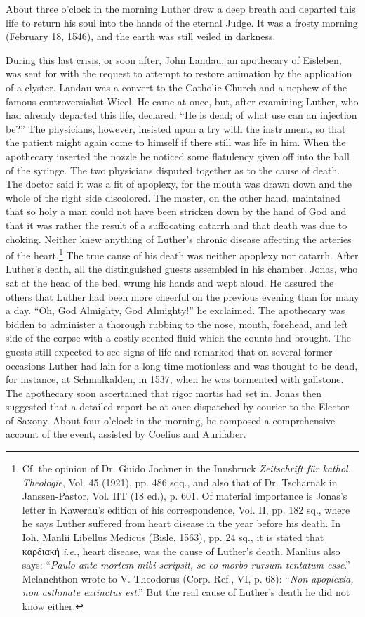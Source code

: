 About three o’clock in the morning Luther drew a deep breath and
departed this life to return his soul into the hands of the eternal
Judge. It was a frosty morning (February 18, 1546), and the earth
was still veiled in darkness.

During this last crisis, or soon after, John Landau, an apothecary
of Eisleben, was sent for with the request to attempt to restore animation
by the application of a clyster. Landau was a convert to the
Catholic Church and a nephew of the famous controversialist Wicel.
He came at once, but, after examining Luther, who had already departed
this life, declared: “He is dead; of what use can an injection
be?” The physicians, however, insisted upon a try with the instrument,
so that the patient might again come to himself if there still
was life in him. When the apothecary inserted the nozzle he noticed
some flatulency given off into the ball of the syringe. The two physicians
disputed together as to the cause of death. The doctor said
it was a fit of apoplexy, for the mouth was drawn down and the
whole of the right side discolored. The master, on the other hand,
maintained that so holy a man could not have been stricken down
by the hand of God and that it was rather the result of a suffocating
catarrh and that death was due to choking. Neither knew anything of
Luther’s chronic disease affecting the arteries of the heart.\footnote
{Cf. the opinion of Dr. Guido Jochner in the Innsbruck \textit{Zeitschrift für kathol. Theologie},
Vol. 45 (1921), pp. 486 sqq., and also that of Dr. Tscharnak in Janssen-Pastor, Vol.
IIT (18 ed.), p. 601. Of material importance is Jonas’s letter in Kawerau’s edition of his
correspondence, Vol. II, pp. 182 sq., where he says Luther suffered from heart disease in
the year before his death. In Ioh. Manlii Libellus Medicus (Bisle, 1563), pp. 24 sq., it
is stated that
καρδιακή
\textit{i.e.}, heart disease, was the cause of Luther’s death. Manlius also says:
“\textit{Paulo ante mortem mibi scripsit, se eo morbo rursum tentatum esse}.” Melanchthon wrote
to V. Theodorus (Corp. Ref., VI, p. 68): “\textit{Non apoplexia, non asthmate extinctus est}.”
But the real cause of Luther’s death he did not know either.}
The true
cause of his death was neither apoplexy nor catarrh.
After Luther’s death, all the distinguished guests assembled in his
chamber. Jonas, who sat at the head of the bed, wrung his hands
and wept aloud. He assured the others that Luther had been more
cheerful on the previous evening than for many a day. “Oh, God
Almighty, God Almighty!” he exclaimed. The apothecary was bidden to administer
a thorough rubbing to the nose, mouth, forehead,
and left side of the corpse with a costly scented fluid which the counts
had brought. The guests still expected to see signs of life and remarked
that on several former occasions Luther had lain for a long
time motionless and was thought to be dead, for instance, at Schmalkalden,
in 1537, when he was tormented with gallstone. The apothecary soon
ascertained that rigor mortis had set in. Jonas then suggested
that a detailed report be at once dispatched by courier to the Elector
of Saxony. About four o’clock in the morning, he composed a comprehensive
account of the event, assisted by Coelius and Aurifaber.

